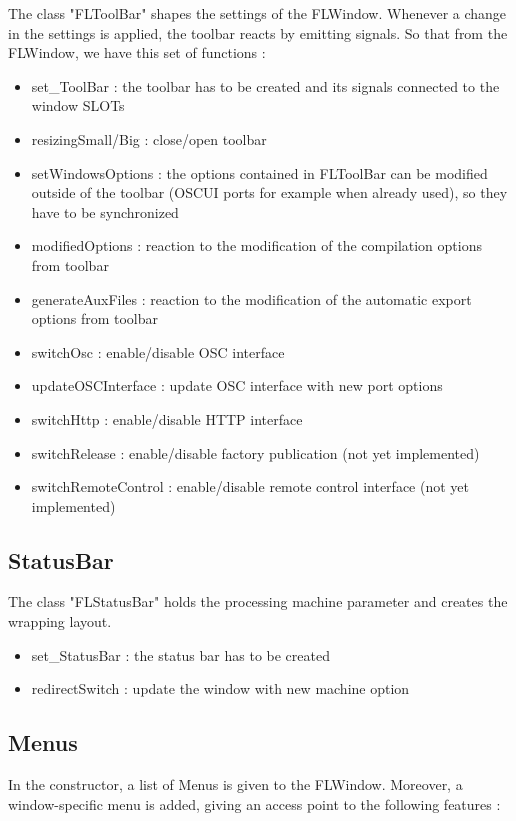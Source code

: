\documentclass[a4paper]{article}
\begin{document}
The class "FLToolBar" shapes the settings of the FLWindow. Whenever a change in the settings is applied, the toolbar reacts by emitting signals. So that from the FLWindow, we have this set of functions :

\begin{itemize}
\item set\_ToolBar : the toolbar has to be created and its signals connected to the window SLOTs
\item resizingSmall/Big : close/open toolbar
\item setWindowsOptions : the options contained in FLToolBar can be modified outside of the toolbar (OSCUI ports for example when already used), so they have to be synchronized
\item modifiedOptions : reaction to the modification of the compilation options from toolbar
\item generateAuxFiles : reaction to the modification of the automatic export options from toolbar
\item switchOsc : enable/disable OSC interface
\item updateOSCInterface : update OSC interface with new port options
\item switchHttp : enable/disable HTTP interface
\item switchRelease : enable/disable factory publication (not yet implemented)
\item switchRemoteControl : enable/disable remote control interface (not yet implemented)
\end{itemize}

\subsection{StatusBar}

The class "FLStatusBar" holds the processing machine parameter and creates the wrapping layout. 

\begin{itemize}
\item set\_StatusBar : the status bar has to be created
\item redirectSwitch : update the window with new machine option
\end{itemize}

\subsection{Menus}

In the constructor, a list of Menus is given to the FLWindow. Moreover, a window-specific menu is added, giving an access point to the following features :
\end{document}
